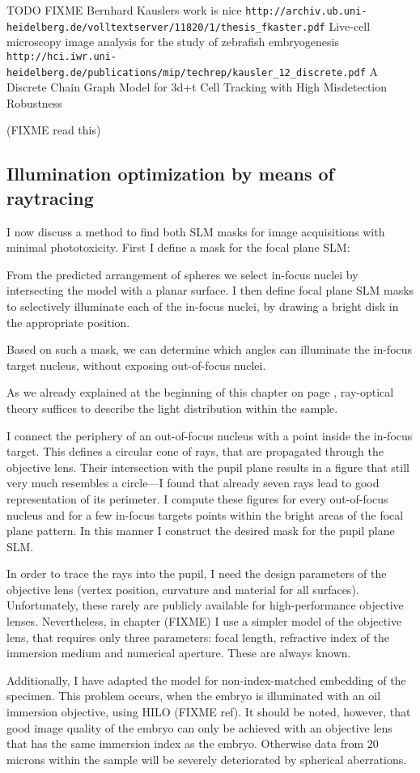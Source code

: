 TODO FIXME Bernhard Kauslers work is nice
\verb!http://archiv.ub.uni-heidelberg.de/volltextserver/11820/1/thesis_fkaster.pdf!
Live-cell microscopy image analysis for the study of zebrafish embryogenesis
\verb!http://hci.iwr.uni-heidelberg.de/publications/mip/techrep/kausler_12_discrete.pdf!
A Discrete Chain Graph Model for
  3d+t Cell Tracking with High
    Misdetection Robustness

(FIXME read this)


\subsection{Illumination optimization by means of raytracing} 
I now discuss a method to find both SLM masks for image acquisitions
with minimal phototoxicity. First I define a mask for the focal plane
SLM:

From the predicted arrangement of spheres we select in-focus nuclei by
intersecting the model with a planar surface. I then define focal
plane SLM masks to selectively illuminate each of the in-focus nuclei,
by drawing a bright disk in the appropriate position.

Based on such a mask, we can determine which angles can illuminate the
in-focus target nucleus, without exposing out-of-focus nuclei.

As we already explained at the beginning of this chapter on page
\pageref{sec:ray-valid}, ray-optical theory suffices to describe the
light distribution within the sample.

I connect the periphery of an out-of-focus nucleus with a point inside
the in-focus target. This defines a circular cone of rays, that are
propagated through the objective lens. Their intersection with the
pupil plane results in a figure that still very much resembles a
circle---I found that already seven rays lead to good representation
of its perimeter.  I compute these figures for every out-of-focus
nucleus and for a few in-focus targets points within the bright areas
of the focal plane pattern. In this manner I construct the desired
mask for the pupil plane SLM.

In order to trace the rays into the pupil, I need the design
parameters of the objective lens (vertex position, curvature and
material for all surfaces). Unfortunately, these rarely are publicly
available for high-performance objective lenses. Nevertheless, in
chapter (FIXME) I use a simpler model of the objective lens, that
requires only three parameters: focal length, refractive index of the
immersion medium and numerical aperture. These are always known.

Additionally, I have adapted the model for non-index-matched embedding
of the specimen. This problem occurs, when the embryo is illuminated
with an oil immersion objective, using HILO (FIXME ref). It should be
noted, however, that good image quality of the embryo can only be
achieved with an objective lens that has the same immersion index as
the embryo. Otherwise data from 20 microns within the sample will be
severely deteriorated by spherical aberrations.
